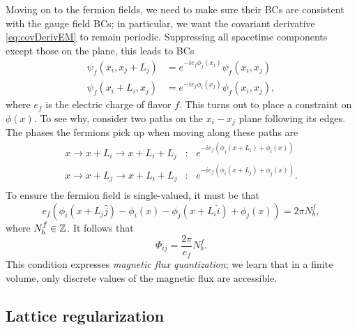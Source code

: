 Moving on to the fermion fields, we need to make sure their BCs are consistent
with the gauge field BCs; in particular, we want the covariant derivative
\eqref{eq:covDerivEM} to remain periodic. Suppressing all spacetime components
except those on the plane, this leads to BCs
\begin{equation}\begin{aligned}
\psi_f(x_i,x_j+L_j)&=e^{-ie_f\phi_j(x_i)}\psi_f(x_i,x_j)\\
\psi_f(x_i+L_i,x_j)&=e^{-ie_f\phi_i(x_j)}\psi_f(x_i,x_j),
\end{aligned}\end{equation}
where $e_f$ is the electric charge of flavor $f$.
This turns out to place a constraint on $\phi(x)$. To see why, consider two paths
on the $x_i-x_j$ plane following its edges. The phases the fermions pick up
when moving along these paths are 
\begin{equation}\begin{aligned}
x\to x+L_i\to x+L_i+L_j &:~~~ e^{-ie_f\left(\phi_j(x+L_i)+\phi_i(x)\right)}\\
x\to x+L_j\to x+L_i+L_j &:~~~ e^{-ie_f\left(\phi_i(x+L_j)+\phi_j(x)\right)}.\\
\end{aligned}\end{equation}
To ensure the fermion field is single-valued, it must be that
\begin{equation}
e_f\left(\phi_i(x+L_j\hat{j})-\phi_i(x)-\phi_j(x+L_i\hat{i})+\phi_j(x)\right)=2\pi
N_b^f,
\end{equation}
where $N_b^f\in\mathbb{Z}$. 
It follows that
\begin{equation}
\Phi_{ij}=\frac{2\pi}{e_f}N_b^f.
\end{equation}
This condition expresses {\it magnetic flux
quantization}; we learn that in a finite volume, only
discrete values of the magnetic flux are accessible.

\subsection{Lattice regularization}

